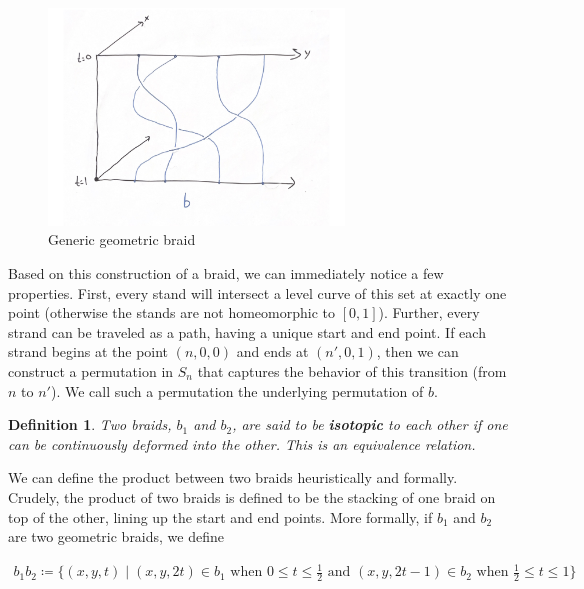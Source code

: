 \documentclass[10pt]{ucthesis}
\newtheorem{definition}{Definition}[chapter]
\begin{document}
\begin{figure}[H]
	\centering
	\includegraphics[width=0.7\textwidth]{geobraid.png}
	\caption{Generic geometric braid}
\end{figure}

Based on this construction of a braid, we can immediately notice a few properties. First, every stand will intersect a level curve of this set at exactly one point (otherwise the stands are not homeomorphic to $[0,1]$). Further, every strand can be traveled as a path, having a unique start and end point. If each strand begins at the point $(n,0,0)$ and ends at $(n',0,1)$, then we can construct a permutation in $S_n$ that captures the behavior of this transition (from $n$ to $n'$). We call such a permutation the underlying permutation of $b$.

\begin{definition}
	Two braids, $b_1$ and $b_2$, are said to be \textbf{isotopic} to each other if one can be continuously deformed into the other. This is an equivalence relation.
\end{definition}

We can define the product between two braids heuristically and formally. Crudely, the product of two braids is defined to be the stacking of one braid on top of the other, lining up the start and end points. More formally, if $b_1$ and $b_2$ are two geometric braids, we define 

\begin{equation}
\begin{aligned}
	b_1b_2 \coloneq \{(x,y,t)\mid (x,y,2t)\in b_1 \text{ when }0\leq t\leq \frac{1}{2} \text{ and }   (x,y,2t - 1)\in b_2 \text{ when }\frac{1}{2}\leq t\leq 1\}
\end{aligned}
\end{equation}
\end{document}

